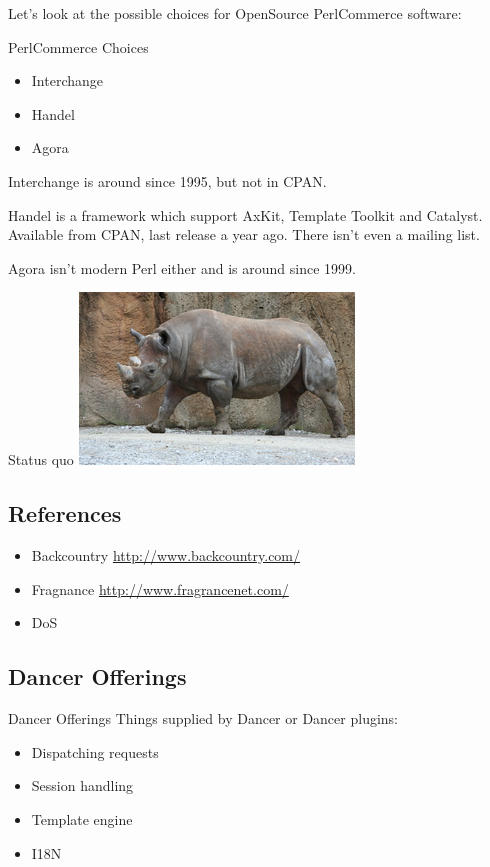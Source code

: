 Let's look at the possible choices for OpenSource PerlCommerce software:

\begin{frame}{PerlCommerce Choices}
\begin{itemize}
\item Interchange
\item Handel
\item Agora
\end{itemize}
\end{frame}

Interchange is around since 1995, but not in CPAN.

Handel is a framework which support AxKit, Template Toolkit 
and Catalyst.
Available from CPAN, last release a year ago.
There isn't even a mailing list.

Agora isn't modern Perl either and is around since 1999.

\begin{frame}{Status quo}
  \includegraphics{rhino.jpg}
\end{frame}

\subsection{References}
\begin{frame}
\begin{itemize}
\item Backcountry \url{http://www.backcountry.com/}
\item Fragnance \url{http://www.fragrancenet.com/}
\item DoS
\end{itemize}
\end{frame}

\subsection{Dancer Offerings}
\begin{frame}{Dancer Offerings}
Things supplied by Dancer or Dancer plugins:

\begin{itemize}
\item Dispatching requests
\item Session handling
\item Template engine
\item I18N
\end{itemize}
\end{frame}

